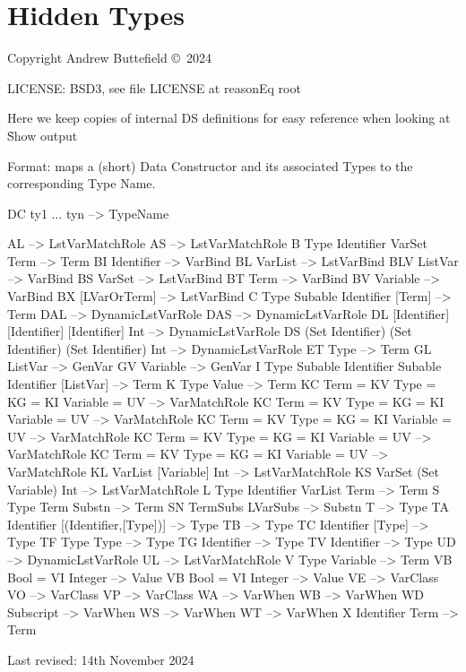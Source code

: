 \chapter{Hidden Types}

Copyright  Andrew Buttefield \copyright\ 2024

LICENSE: BSD3, see file LICENSE at reasonEq root


Here we keep copies of internal DS definitions
for easy reference when looking at \h{Show} output
\newpage

Format: maps a (short) Data Constructor and its associated Types to the corresponding Type Name.
\begin{code}
DC ty1 ... tyn -->  TypeName
\end{code}


\begin{code}
AL  -->  LstVarMatchRole
AS  -->  LstVarMatchRole
B Type Identifier VarSet Term  -->  Term
BI Identifier  -->  VarBind
BL  VarList  -->  LstVarBind
BLV ListVar   -->  VarBind
BS  VarSet  -->  LstVarBind
BT Term  -->  VarBind
BV Variable   -->  VarBind
BX  [LVarOrTerm]   -->  LstVarBind
C Type Subable Identifier [Term]  -->  Term
DAL  -->  DynamicLstVarRole
DAS  -->  DynamicLstVarRole
DL [Identifier] [Identifier] [Identifier] Int  -->  DynamicLstVarRole
DS (Set Identifier) (Set Identifier) (Set Identifier) Int --> DynamicLstVarRole
ET Type   -->  Term
GL ListVar   -->  GenVar
GV Variable -->  GenVar
I Type Subable Identifier Subable Identifier [ListVar]  -->  Term
K Type Value  -->  Term
KC Term = KV Type = KG = KI Variable = UV   -->  VarMatchRole
KC Term = KV Type = KG = KI Variable = UV   -->  VarMatchRole
KC Term = KV Type = KG = KI Variable = UV   -->  VarMatchRole
KC Term = KV Type = KG = KI Variable = UV   -->  VarMatchRole
KC Term = KV Type = KG = KI Variable = UV   -->  VarMatchRole
KL VarList [Variable] Int  -->  LstVarMatchRole
KS VarSet (Set Variable) Int  -->  LstVarMatchRole
L Type Identifier VarList Term  -->  Term
S Type Term Substn -->  Term
SN TermSubs LVarSubs   -->  Substn
T  -->  Type
TA Identifier [(Identifier,[Type])]  -->  Type
TB   -->  Type
TC Identifier [Type]  -->  Type
TF Type Type  -->  Type
TG Identifier -->  Type
TV Identifier  -->  Type
UD   -->  DynamicLstVarRole
UL   -->  LstVarMatchRole
V Type Variable  -->  Term
VB Bool = VI Integer   -->  Value
VB Bool = VI Integer   -->  Value
VE  -->  VarClass
VO  -->  VarClass
VP   -->  VarClass
WA  -->  VarWhen
WB  -->  VarWhen
WD Subscript  -->  VarWhen
WS  -->  VarWhen
WT   -->  VarWhen
X Identifier Term  -->  Term
\end{code}
Last revised: 14th November 2024